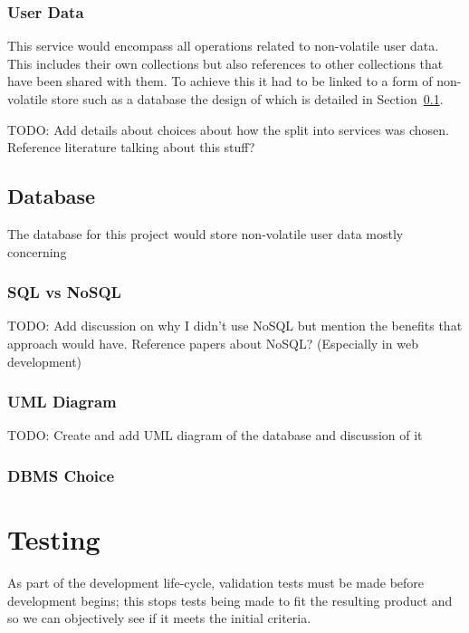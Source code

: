 \subsubsection{User Data}
This service would encompass all operations related to non-volatile user data. This includes their own collections but also references to other collections that have been shared with them. To achieve this it had to be linked to a form of non-volatile store such as a database the design of which is detailed in Section~\ref{sec:database}.

TODO: Add details about choices about how the split into services was chosen. Reference literature talking about this stuff?

\subsection{Database} \label{sec:database}
The database for this project would store non-volatile user data mostly concerning

\subsubsection{SQL vs NoSQL}
TODO: Add discussion on why I didn't use NoSQL but mention the benefits that approach would have. Reference papers about NoSQL? (Especially in web development)
\subsubsection{UML Diagram}
TODO: Create and add UML diagram of the database and discussion of it
\subsubsection{DBMS Choice}


\section{Testing} \label{sec:test-design}
As part of the development life-cycle, validation tests must be made before development begins; this stops tests being made to fit the resulting product and so we can objectively see if it meets the initial criteria.


